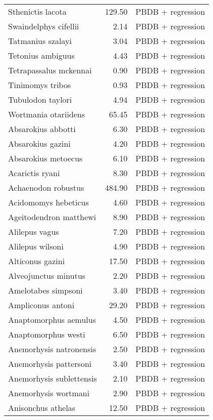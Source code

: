 \begin{table}[ht]
\begin{tabular}{lrl}
  Sthenictis lacota & 129.50 & PBDB + regression \\ 
  Swaindelphys cifellii & 2.14 & PBDB + regression \\ 
  Tatmanius szalayi & 3.04 & PBDB + regression \\ 
  Tetonius ambiguus & 4.43 & PBDB + regression \\ 
  Tetrapassalus mckennai & 0.90 & PBDB + regression \\ 
  Tinimomys tribos & 0.93 & PBDB + regression \\ 
  Tubulodon taylori & 4.94 & PBDB + regression \\ 
  Wortmania otariidens & 65.45 & PBDB + regression \\ 
  Absarokius abbotti & 6.30 & PBDB + regression \\ 
  Absarokius gazini & 4.20 & PBDB + regression \\ 
  Absarokius metoecus & 6.10 & PBDB + regression \\ 
  Acarictis ryani & 8.30 & PBDB + regression \\ 
  Achaenodon robustus & 484.90 & PBDB + regression \\ 
  Acidomomys hebeticus & 4.60 & PBDB + regression \\ 
  Ageitodendron matthewi & 8.90 & PBDB + regression \\ 
  Alilepus vagus & 7.20 & PBDB + regression \\ 
  Alilepus wilsoni & 4.90 & PBDB + regression \\ 
  Alticonus gazini & 17.50 & PBDB + regression \\ 
  Alveojunctus minutus & 2.20 & PBDB + regression \\ 
  Amelotabes simpsoni & 3.40 & PBDB + regression \\ 
  Ampliconus antoni & 29.20 & PBDB + regression \\ 
  Anaptomorphus aemulus & 4.50 & PBDB + regression \\ 
  Anaptomorphus westi & 6.50 & PBDB + regression \\ 
  Anemorhysis natronensis & 2.50 & PBDB + regression \\ 
  Anemorhysis pattersoni & 3.40 & PBDB + regression \\ 
  Anemorhysis sublettensis & 2.10 & PBDB + regression \\ 
  Anemorhysis wortmani & 2.90 & PBDB + regression \\ 
  Anisonchus athelas & 12.50 & PBDB + regression \\ 

\end{tabular}
\end{table}
